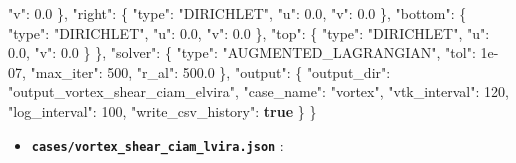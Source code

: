 \documentclass[
  10pt,
]{article}
\newenvironment{Shaded}{}{}
\newcommand{\DataTypeTok}[1]{\textcolor[rgb]{0.56,0.13,0.00}{#1}}
\newcommand{\DecValTok}[1]{\textcolor[rgb]{0.25,0.63,0.44}{#1}}
\newcommand{\FloatTok}[1]{\textcolor[rgb]{0.25,0.63,0.44}{#1}}
\newcommand{\FunctionTok}[1]{\textcolor[rgb]{0.02,0.16,0.49}{#1}}
\newcommand{\KeywordTok}[1]{\textcolor[rgb]{0.00,0.44,0.13}{\textbf{#1}}}
\newcommand{\StringTok}[1]{\textcolor[rgb]{0.25,0.44,0.63}{#1}}
\providecommand{\tightlist}{%
  \setlength{\itemsep}{0pt}\setlength{\parskip}{0pt}}
\begin{document}
\begin{Shaded}
\begin{Highlighting}[]
      \DataTypeTok{"v"}\FunctionTok{:} \FloatTok{0.0}
    \FunctionTok{\},}
    \DataTypeTok{"right"}\FunctionTok{:} \FunctionTok{\{}
      \DataTypeTok{"type"}\FunctionTok{:} \StringTok{"DIRICHLET"}\FunctionTok{,}
      \DataTypeTok{"u"}\FunctionTok{:} \FloatTok{0.0}\FunctionTok{,}
      \DataTypeTok{"v"}\FunctionTok{:} \FloatTok{0.0}
    \FunctionTok{\},}
    \DataTypeTok{"bottom"}\FunctionTok{:} \FunctionTok{\{}
      \DataTypeTok{"type"}\FunctionTok{:} \StringTok{"DIRICHLET"}\FunctionTok{,}
      \DataTypeTok{"u"}\FunctionTok{:} \FloatTok{0.0}\FunctionTok{,}
      \DataTypeTok{"v"}\FunctionTok{:} \FloatTok{0.0}
    \FunctionTok{\},}
    \DataTypeTok{"top"}\FunctionTok{:} \FunctionTok{\{}
      \DataTypeTok{"type"}\FunctionTok{:} \StringTok{"DIRICHLET"}\FunctionTok{,}
      \DataTypeTok{"u"}\FunctionTok{:} \FloatTok{0.0}\FunctionTok{,}
      \DataTypeTok{"v"}\FunctionTok{:} \FloatTok{0.0}
    \FunctionTok{\}}
  \FunctionTok{\},}
  \DataTypeTok{"solver"}\FunctionTok{:} \FunctionTok{\{}
    \DataTypeTok{"type"}\FunctionTok{:} \StringTok{"AUGMENTED\_LAGRANGIAN"}\FunctionTok{,}
    \DataTypeTok{"tol"}\FunctionTok{:} \DecValTok{1e{-}07}\FunctionTok{,}
    \DataTypeTok{"max\_iter"}\FunctionTok{:} \DecValTok{500}\FunctionTok{,}
    \DataTypeTok{"r\_al"}\FunctionTok{:} \FloatTok{500.0}
  \FunctionTok{\},}
  \DataTypeTok{"output"}\FunctionTok{:} \FunctionTok{\{}
    \DataTypeTok{"output\_dir"}\FunctionTok{:} \StringTok{"output\_vortex\_shear\_ciam\_elvira"}\FunctionTok{,}
    \DataTypeTok{"case\_name"}\FunctionTok{:} \StringTok{"vortex"}\FunctionTok{,}
    \DataTypeTok{"vtk\_interval"}\FunctionTok{:} \DecValTok{120}\FunctionTok{,}
    \DataTypeTok{"log\_interval"}\FunctionTok{:} \DecValTok{100}\FunctionTok{,}
    \DataTypeTok{"write\_csv\_history"}\FunctionTok{:} \KeywordTok{true}
  \FunctionTok{\}}
\FunctionTok{\}}
\end{Highlighting}
\end{Shaded}

\begin{itemize}
\tightlist
\item
  \textbf{\texttt{cases/vortex\_shear\_ciam\_lvira.json}} :
\end{itemize}
\end{document}

